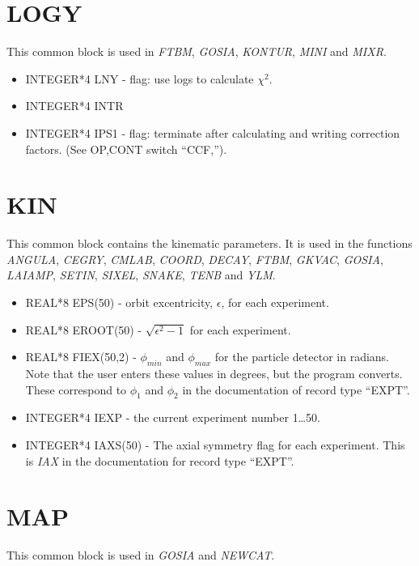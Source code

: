 \section{LOGY}

This common block is used in \emph{FTBM}, \emph{GOSIA}, \emph{KONTUR}, \emph{
MINI} and \emph{MIXR}.

\begin{itemize}
\item INTEGER*4 LNY - flag: use logs to calculate $\chi^2$.
\item INTEGER*4 INTR
\item INTEGER*4 IPS1 - flag: terminate after calculating and writing
correction factors. (See OP,CONT switch ``CCF,'').
\end{itemize}

\section{KIN}

This common block contains the kinematic parameters. It is used in the
functions \emph{ANGULA}, \emph{CEGRY}, \emph{CMLAB}, \emph{COORD}, \emph{DECAY},
\emph{FTBM}, \emph{GKVAC}, \emph{GOSIA}, \emph{LAIAMP}, \emph{SETIN}, \emph{
SIXEL}, \emph{SNAKE}, \emph{TENB} and \emph{YLM}.

\begin{itemize}
\item REAL*8 EPS(50) - orbit excentricity, $\epsilon$, for each experiment.
\item REAL*8 EROOT(50) - $\sqrt{\epsilon^2 -1}$ for each experiment.
\item REAL*8 FIEX(50,2) - $\phi_{min}$ and $\phi_{max}$ for the particle
detector in radians. Note that the user enters these values in degrees, but
the program converts. These correspond to $\phi_1$ and $\phi_2$ in the
documentation of record type ``EXPT''.
\item INTEGER*4 IEXP - the current experiment number 1{\ldots}50.
\item INTEGER*4 IAXS(50) - The axial symmetry flag for each experiment. This
is \emph{IAX} in the documentation for record type ``EXPT''.
\end{itemize}

\section{MAP}

This common block is used in \emph{GOSIA} and \emph{NEWCAT}.

